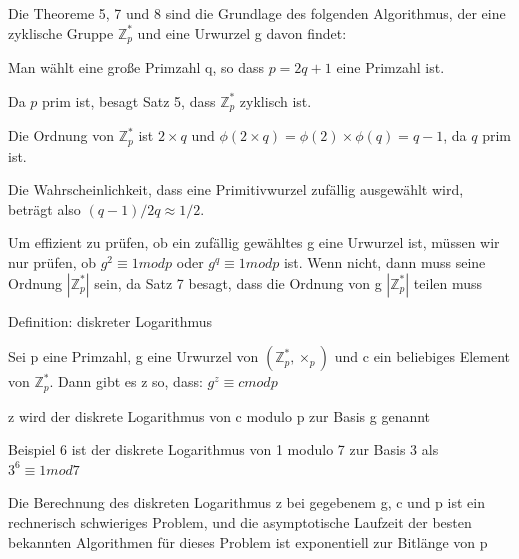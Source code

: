 \documentclass[a4paper]{article}
\begin{document}
\begin{multicols}{3}
\begin{itemize*}
\begin{itemize*}
            \end{itemize*}
            \item Die Theoreme 5, 7 und 8 sind die Grundlage des folgenden Algorithmus, der eine zyklische Gruppe $\mathbb{Z}^*_p$ und eine Urwurzel g davon findet:
            \begin{itemize*}
                  \item Man wählt eine große Primzahl q, so dass $p=2q+1$ eine Primzahl ist.
                  \begin{itemize*}
                        \item Da $p$ prim ist, besagt Satz 5, dass $\mathbb{Z}^*_p$ zyklisch ist.
                        \item Die Ordnung von $\mathbb{Z}^*_p$ ist $2\times q$ und $\phi(2\times q)=\phi(2)\times \phi(q)=q-1$, da $q$ prim ist.
                        \item Die Wahrscheinlichkeit, dass eine Primitivwurzel zufällig ausgewählt wird, beträgt also $(q-1)/2q \approx 1/2$.
                        \item Um effizient zu prüfen, ob ein zufällig gewähltes g eine Urwurzel ist, müssen wir nur prüfen, ob $g^2\equiv 1 mod p$ oder $g^q\equiv 1 mod p$ ist. Wenn nicht, dann muss seine Ordnung $|\mathbb{Z}^*_p|$ sein, da Satz 7 besagt, dass die Ordnung von g $|\mathbb{Z}^*_p|$ teilen muss
                  \end{itemize*}
            \end{itemize*}
            \item Definition: diskreter Logarithmus
            \begin{itemize*}
                  \item Sei p eine Primzahl, g eine Urwurzel von $(\mathbb{Z}^*_p,\times_p)$ und c ein beliebiges Element von $\mathbb{Z}^*_p$. Dann gibt es z so, dass: $g^z\equiv c mod p$
                  \item z wird der diskrete Logarithmus von c modulo p zur Basis g genannt
                  \item Beispiel 6 ist der diskrete Logarithmus von 1 modulo 7 zur Basis 3 als $3^6\equiv 1 mod 7$
                  \item Die Berechnung des diskreten Logarithmus z bei gegebenem g, c und p ist ein rechnerisch schwieriges Problem, und die asymptotische Laufzeit der besten bekannten Algorithmen für dieses Problem ist exponentiell zur Bitlänge von p
            \end{itemize*}
      \end{itemize*}


\end{multicols}
\end{document}
